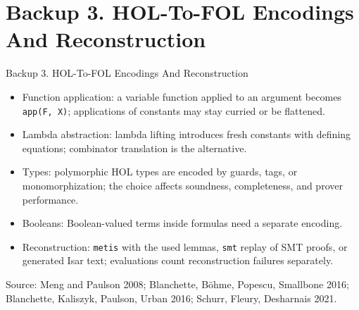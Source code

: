 \documentclass[aspectratio=169,11pt]{beamer}
\begin{document}
\section{Backup 3. HOL-To-FOL Encodings And Reconstruction}
\begin{frame}[fragile,t]{Backup 3. HOL-To-FOL Encodings And Reconstruction}
\begin{itemize}
\setlength{\itemsep}{1pt}
\setlength{\parsep}{0pt}
\setlength{\parskip}{0pt}
\item Function application: a variable function applied to an argument becomes \texttt{app(F, X)}; applications of constants may stay curried or be flattened.
\item Lambda abstraction: lambda lifting introduces fresh constants with defining equations; combinator translation is the alternative.
\item Types: polymorphic HOL types are encoded by guards, tags, or monomorphization; the choice affects soundness, completeness, and prover performance.
\item Booleans: Boolean-valued terms inside formulas need a separate encoding.
\item Reconstruction: \texttt{metis} with the used lemmas, \texttt{smt} replay of SMT proofs, or generated Isar text; evaluations count reconstruction failures separately.
\end{itemize}
Source: Meng and Paulson 2008; Blanchette, Böhme, Popescu, Smallbone 2016; Blanchette, Kaliszyk, Paulson, Urban 2016; Schurr, Fleury, Desharnais 2021.

\end{frame}
\end{document}
